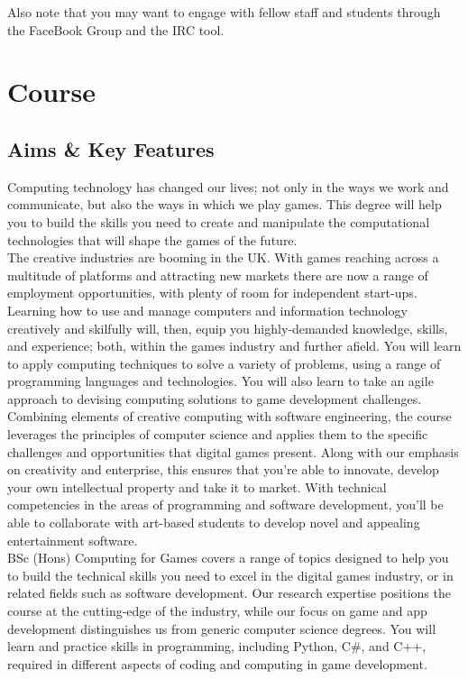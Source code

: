Also note that you may want to engage with fellow staff and students through the FaceBook Group and the IRC tool.\\

\chapter{Course}
\newpage

\section{Aims \& Key Features}

Computing technology has changed our lives; not only in the ways we work and communicate, but also the ways in which we play games. This degree will help you to build the skills you need to create and manipulate the computational technologies that will shape the games of the future. \\

The creative industries are booming in the UK. With games reaching across a multitude of platforms and attracting new markets there are now a range of employment opportunities, with plenty of room for independent start-ups. Learning how to use and manage computers and information technology creatively and skilfully will, then, equip you highly-demanded knowledge, skills, and experience; both, within the games industry and further afield. You will learn to apply computing techniques to solve a variety of problems, using a range of programming languages and technologies. You will also learn to take an agile approach to devising computing solutions to game development challenges. Combining elements of creative computing with software engineering, the course leverages the principles of computer science and applies them to the specific challenges and opportunities that digital games present. Along with our emphasis on creativity and enterprise, this ensures that you're able to innovate, develop your own intellectual property and take it to market. With technical competencies in the areas of programming and software development, you'll be able to collaborate with art-based students to develop novel and appealing entertainment software. \\

BSc (Hons) Computing for Games covers a range of topics designed to help you to build the technical skills you need to excel in the digital games industry, or in related fields such as software development. Our research expertise positions the course at the cutting-edge of the industry, while our focus on game and app development distinguishes us from generic computer science degrees. You will learn and practice skills in programming, including Python, C\#, and C++, required in different aspects of coding and computing in game development.\\

